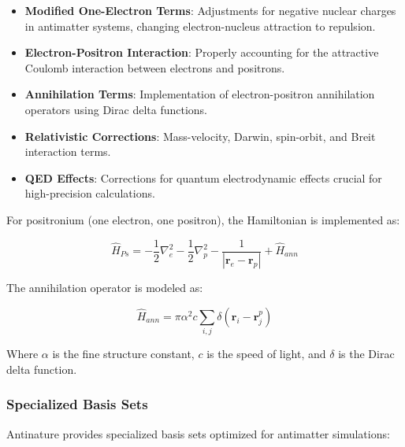 \documentclass[10pt,twocolumn,a4paper]{article}
\begin{document}
\begin{itemize}
    \item \textbf{Modified One-Electron Terms}: Adjustments for negative nuclear charges in antimatter systems, changing electron-nucleus attraction to repulsion.
    
    \item \textbf{Electron-Positron Interaction}: Properly accounting for the attractive Coulomb interaction between electrons and positrons.
    
    \item \textbf{Annihilation Terms}: Implementation of electron-positron annihilation operators using Dirac delta functions.
    
    \item \textbf{Relativistic Corrections}: Mass-velocity, Darwin, spin-orbit, and Breit interaction terms.
    
    \item \textbf{QED Effects}: Corrections for quantum electrodynamic effects crucial for high-precision calculations.
\end{itemize}

For positronium (one electron, one positron), the Hamiltonian is implemented as:

\begin{equation}
    \hat{H}_{Ps} = -\frac{1}{2}\nabla_e^2 - \frac{1}{2}\nabla_p^2 - \frac{1}{|\textbf{r}_e - \textbf{r}_p|} + \hat{H}_{ann}
\end{equation}

The annihilation operator is modeled as:

\begin{equation}
    \hat{H}_{ann} = \pi\alpha^2 c \sum_{i,j} \delta(\textbf{r}_i - \textbf{r}_j^p)
\end{equation}

Where $\alpha$ is the fine structure constant, $c$ is the speed of light, and $\delta$ is the Dirac delta function.

\subsubsection{Specialized Basis Sets}
Antinature provides specialized basis sets optimized for antimatter simulations:
\end{document}
